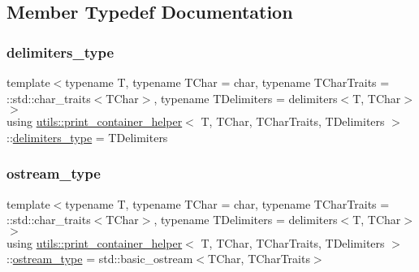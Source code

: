 \subsection{Member Typedef Documentation}
\mbox{\label{structutils_1_1print__container__helper_a091ced23409c5a8994e917861af4c1e3}} 
\subsubsection{\texorpdfstring{delimiters\_type}{delimiters\_type}}
{\footnotesize\ttfamily template$<$typename T, typename T\+Char = char, typename T\+Char\+Traits = \+::std\+::char\+\_\+traits$<$\+T\+Char$>$, typename T\+Delimiters = delimiters$<$\+T, T\+Char$>$$>$ \\
using \mbox{\hyperlink{structutils_1_1print__container__helper}{utils\+::print\+\_\+container\+\_\+helper}}$<$ T, T\+Char, T\+Char\+Traits, T\+Delimiters $>$\+::\mbox{\hyperlink{structutils_1_1print__container__helper_a091ced23409c5a8994e917861af4c1e3}{delimiters\+\_\+type}} =  T\+Delimiters}

\mbox{\label{structutils_1_1print__container__helper_a49abcd9f1eb893c1389687f0c7de5811}} 
\subsubsection{\texorpdfstring{ostream\_type}{ostream\_type}}
{\footnotesize\ttfamily template$<$typename T, typename T\+Char = char, typename T\+Char\+Traits = \+::std\+::char\+\_\+traits$<$\+T\+Char$>$, typename T\+Delimiters = delimiters$<$\+T, T\+Char$>$$>$ \\
using \mbox{\hyperlink{structutils_1_1print__container__helper}{utils\+::print\+\_\+container\+\_\+helper}}$<$ T, T\+Char, T\+Char\+Traits, T\+Delimiters $>$\+::\mbox{\hyperlink{structutils_1_1print__container__helper_a49abcd9f1eb893c1389687f0c7de5811}{ostream\+\_\+type}} =  std\+::basic\+\_\+ostream$<$T\+Char, T\+Char\+Traits$>$}



